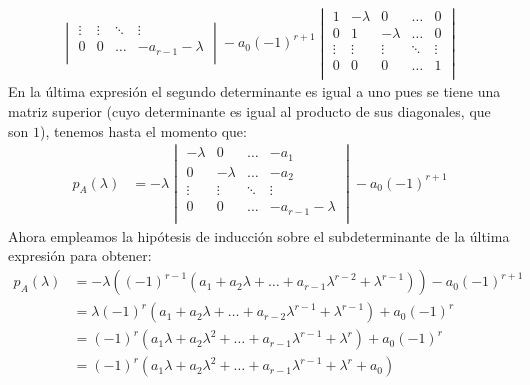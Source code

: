 \documentclass[letter]{memoir} %
\begin{document}
\begin{enumerate}
\begin{enumerate}
\[\begin{split}
\begin{vmatrix}
                 \vdots & \vdots & \ddots & \vdots \\
                 0 & 0 & \dots & -a_{r-1} -\lambda\\
				\end{vmatrix} -a_0(-1)^{r+1}
                \begin{vmatrix}
                1 & -\lambda & 0 & \dots & 0 \\
                0 & 1 & -\lambda & \dots & 0\\
                \vdots & \vdots & \vdots & \ddots & \vdots \\
                0 & 0 & 0 & \dots & 1 \\
				\end{vmatrix}
\end{split}
\]
En la última expresión el segundo determinante es igual a uno pues se tiene una matriz superior (cuyo determinante es igual al producto de sus diagonales, que son $1$), tenemos hasta el momento que:
\[
\begin{split}
p_A(\lambda)  &= -\lambda \begin{vmatrix}
				 -\lambda & 0 & \dots & -a_1 \\
                 0 & -\lambda & \dots & -a_2\\
                 \vdots & \vdots & \ddots & \vdots \\
                 0 & 0 & \dots & -a_{r-1} -\lambda\\
				\end{vmatrix} -a_0(-1)^{r+1}
\end{split}
\]
Ahora empleamos la hipótesis de inducción sobre el subdeterminante de la última expresión para obtener:\\
\[
\begin{split}
p_A(\lambda)  &= -\lambda \left( (-1)^{r-1} (a_1 +a_2\lambda + \dots + a_{r-1}\lambda^{r-2} + \lambda^{r-1}) \right) -a_0(-1)^{r+1} \\
& = \lambda  (-1)^{r} (a_1 +a_2\lambda + \dots + a_{r-2}\lambda^{r-1} + \lambda^{r-1})  +a_0(-1)^{r} \\
& = (-1)^{r} (a_1\lambda +a_2\lambda^2 + \dots + a_{r-1}\lambda^{r-1} + \lambda^{r})  +a_0(-1)^{r} \\
& = (-1)^{r} (a_1\lambda +a_2\lambda^2 + \dots + a_{r-1}\lambda^{r-1} + \lambda^{r}  +a_0) \\
\end{split}
\]

\end{enumerate}

\end{enumerate}
\end{document}
